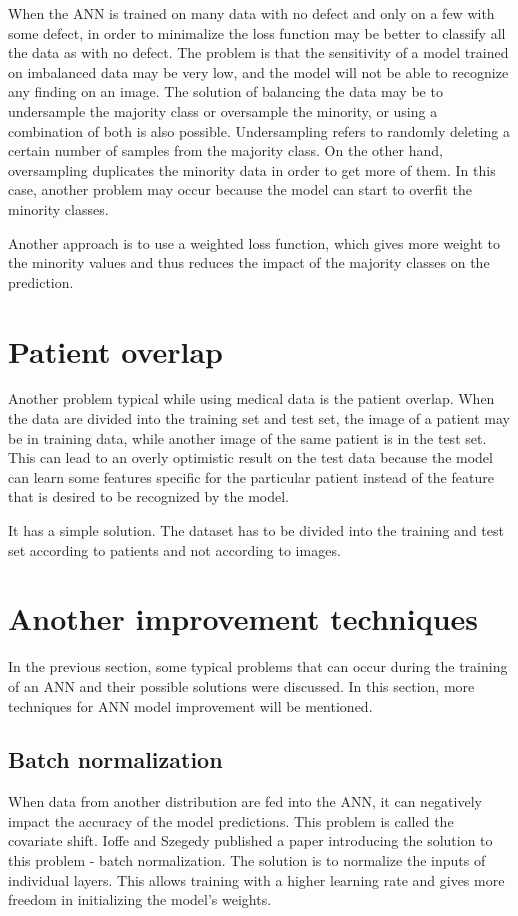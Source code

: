 \documentclass[thesis=B,english]{FITthesis}[2019/12/23]
\begin{document}
When the ANN is trained on many data with no defect and only on a few with some defect, in order to minimalize the loss function may be better to classify all the data as with no defect. The problem is that the sensitivity of a model trained on imbalanced data may be very low, and the model will not be able to recognize any finding on an image. The solution of balancing the data may be to undersample the majority class or oversample the minority, or using a combination of both is also possible. Undersampling refers to randomly deleting a certain number of samples from the majority class. On the other hand, oversampling duplicates the minority data in order to get more of them. In this case, another problem may occur because the model can start to overfit the minority classes.

Another approach is to use a weighted loss function, which gives more weight to the minority values and thus reduces the impact of the majority classes on the prediction.

\section{Patient overlap}
Another problem typical while using medical data is the patient overlap. When the data are divided into the training set and test set, the image of a patient may be in training data, while another image of the same patient is in the test set. This can lead to an overly optimistic result on the test data because the model can learn some features specific for the particular patient instead of the feature that is desired to be recognized by the model.

It has a simple solution. The dataset has to be divided into the training and test set according to patients and not according to images.

\section{Another improvement techniques}
In the previous section, some typical problems that can occur during the training of an ANN and their possible solutions were discussed. In this section, more techniques for ANN model improvement will be mentioned.

\subsection{Batch normalization}
When data from another distribution are fed into the ANN, it can negatively impact the accuracy of the model predictions. This problem is called the covariate shift. Ioffe and Szegedy published a paper \cite{DBLP:journals/corr/IoffeS15} introducing the solution to this problem - batch normalization. The solution is to normalize the inputs of individual layers. This allows training with a higher learning rate and gives more freedom in initializing the model's weights.
\end{document}
